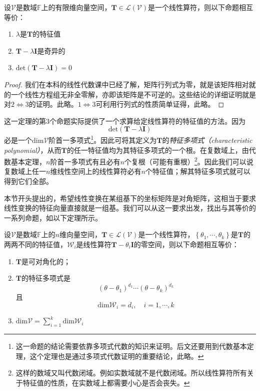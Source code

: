 \documentclass[../main.tex]{subfiles}
\begin{document}
\begin{theorem}\label{thm:II.2.27}
    设$\mathcal{V}$是数域$\mathbb{F}$上的有限维向量空间，$\mathbf{T}\in\mathcal{L}\left(\mathcal{V}\right)$是一个线性算符，则以下命题相互等价：
    \begin{enumerate}
        \item $\lambda$是$\mathbf{T}$的特征值
        \item $\mathbf{T}-\lambda\mathbf{I}$是奇异的
        \item $\mathrm{det}\left(\mathbf{T}-\lambda\mathbf{I}\right)=0$
    \end{enumerate}
    \begin{proof}
        我们在本科的线性代数课中已经了解，矩阵行列式为零，就是该矩阵相对就的一个线性方程组无非全零解，亦即该矩阵是不可逆的。这些结论的详细证明就是对$2\Leftrightarrow 3$的证明。此略。$1\Leftrightarrow 3$可利用行列式的性质简单证得，此略。
    \end{proof}
\end{theorem}

这一定理的第3个命题实际提供了一个求算给定线性算符的特征值的方法。因为
\[\mathrm{det}\left(\mathbf{T}-\lambda\mathbf{I}\right)\]
必是一个$\mathrm{dim}\mathcal{V}$阶首一多项式\footnote{这一命题的结论需要依靠多项式代数的知识来证明。后文还要用到代数基本定理，这个定理也是通过多项式代数证明的重要结论，此略\cite{Hoffman1971}。}。因此可将其定义为$\mathbf{T}$的\emph{特征多项式}\emph{（characteristic polynomial）}，从而$\mathbf{T}$的任一特征值均为其特征多项式的一个根。在复数域上，由代数基本定理，$n$阶首一多项式有且必有$n$个复根（可能有重根）\footnote{这样的数域又叫代数闭域。例如实数域就不是代数闭域。所以线性算符所有关于特征值的性质，在实数域上都需要小心是否会丧失。}。因此我们可以说复数域上任一$n$维线性空间上的线性算符必有$n$个特征值；解其特征多项式就可以得到它们全部。

本节开头提出的，希望线性变换在某组基下的坐标矩阵是对角矩阵，这相当于要求线性变换的特征向量直接就是一组基。我们可以从这一要求出发，找出与其等价的一系列命题，如以下定理所示。

\begin{theorem}\label{thm:II.2.28}
    设$\mathcal{V}$是数域$\mathbb{F}$上的$n$维向量空间，$\mathbf{T}\in\mathcal{L}\left(\mathcal{V}\right)$是一个线性算符，$\left\{\theta_1,\cdots,\theta_k\right\}$是$\mathbf{T}$的两两不同的特征值，$\mathcal{W}_i$是线性算符$\mathbf{T}-\theta_i\mathbf{I}$的零空间，则以下命题相互等价：
    \begin{enumerate}
        \item $\mathbf{T}$是可对角化的；
        \item $\mathbf{T}$的特征多项式是
              \[\left(\theta-\theta_1\right)^{d_1}\cdots\left(\theta-\theta_k\right)^{d_k}\]
              且
              \[\mathrm{dim}\mathcal{W}_i=d_i,\quad i=1,\cdots,k\]
        \item $\mathrm{dim}\mathcal{V}=\sum_{i=1}^k\mathrm{dim}\mathcal{W}_i$
    \end{enumerate}
\end{theorem}
\end{document}
